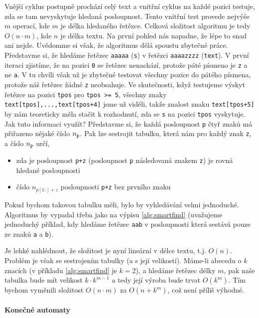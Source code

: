 Vnější cyklus postupně prochází celý text a vnitřní cyklus na každé pozici testuje, zda
se tam nevyskytuje hledaná posloupnost. Tento vnitřní test provede nejvýše \(m\) operací,
kde \(m\) je délka hledaného řetězce. Celková složitost algoritmu je tedy \(O(n\cdot m)\),
kde \(n\) je délka textu. Na první pohled nás napadne, že lépe to snad ani nejde.
Uvědomme si však, že algoritmus dělá spoustu zbytečné práce. Představme si, že hledáme
řetězec {\tt aaaaa} ({\tt s}) v řetězci {\tt aaaazzzz} ({\tt text}). V první iteraci zjistíme, že na pozici {\tt 0}
se řetězec nenachází, protože páté písmeno je {\tt z} a ne {\tt a}. V tu chvíli však už je
zbytečné testovat všechny pozice do pátého písmena, protože náš řetězec žádné
{\tt z} neobsahuje.  Ve skutečnosti,  když testujeme výskyt řetězce na pozici {\tt tpos}
pro {\tt tpos >= 5}, všechny znaky {\tt text[tpos],...,text[tpos+4]} jsme už viděli, takže
znalost znaku {\tt text[tpos+5]} by nám teoreticky měla stačit k rozhodnutí, zda se
{\tt s} na pozici {\tt tpos} vyskytuje. Jak tuto informaci využít? Představme si, že každá
posloupnost {\tt p} čtyř znaků má přiřazeno nějaké číslo \(n_{\tt p}\). Pak lze sestrojit
tabulku, která nám pro každý znak {\tt z}, a číslo \(n_{\tt p}\) určí,

\begin{itemize}
 \item zda je posloupnost {\tt p+z} (posloupnost {\tt p} následovaná znakem {\tt z}) je rovná hledané posloupnosti
 \item číslo \(n_{p[1:]+z}\) posloupnosti {\tt p+z} bez prvního znaku
\end{itemize}

Pokud bychom takovou tabulku měli, bylo by vyhledávání velmi jednoduché. Algoritmus
by vypadal třeba jako na výpisu \ref{alg:smartfind} (uvažujeme jednoduchý příklad, kdy
hledáme řetězec {\tt aab} v posloupnosti která sestává pouze ze znaků {\tt a} a {\tt b}).


Je lehké nahlédnout, že složitost je nyní lineární v délce textu, t.j. \(O(n)\). Problém je
však se sestrojením tabulky (a s její velikostí). Máme-li abecedu o \(k\) znacích
(v příkladu \ref{alg:smartfind} je \(k=2\)), a hledáme řetězec délky \(m\), pak naše tabulka
bude mít velikost \(k\cdot k^{m-1}\) a tedy její výroba bude trvat \(O(k^{m})\).
Tím bychom vyměnili složitost \(O(n\cdot m)\) za \(O(n+k^{m})\), což není příliš výhodné.

\paragraph{Konečné automaty}

